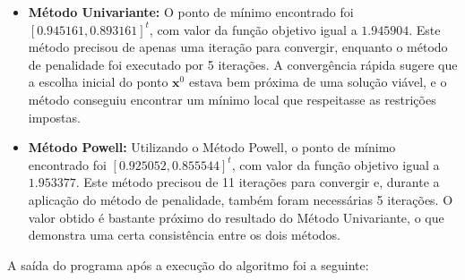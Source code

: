 \documentclass[a4paper, 12pt]{article}
\begin{document}
\begin{itemize}
    \item \textbf{Método Univariante:} O ponto de mínimo encontrado foi \([0.945161, 0.893161]^t\), com valor da função objetivo igual a \(1.945904\). Este método precisou de apenas uma iteração para convergir, enquanto o método de penalidade foi executado por 5 iterações. A convergência rápida sugere que a escolha inicial do ponto \(\mathbf{x}^0\) estava bem próxima de uma solução viável, e o método conseguiu encontrar um mínimo local que respeitasse as restrições impostas.

    \item \textbf{Método Powell:} Utilizando o Método Powell, o ponto de mínimo encontrado foi \([0.925052, 0.855544]^t\), com valor da função objetivo igual a \(1.953377\). Este método precisou de 11 iterações para convergir e, durante a aplicação do método de penalidade, também foram necessárias 5 iterações. O valor obtido é bastante próximo do resultado do Método Univariante, o que demonstra uma certa consistência entre os dois métodos.

\end{itemize}

\begin{table}[H]
\centering
{}
\caption{Resultados dos Métodos de Penalidade e Otimização Sem Restrições}
\end{table}

A saída do programa após a execução do algoritmo foi a seguinte:
\end{document}
